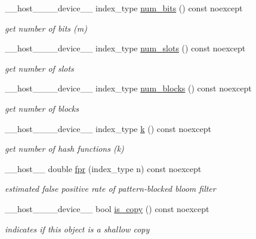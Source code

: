 \begin{DoxyCompactItemize}
\+\_\+\+\_\+host\+\_\+\+\_\+\+\_\+\+\_\+device\+\_\+\+\_\+ index\+\_\+type \hyperlink{classwarpcore_1_1BloomFilter_a54a25926cf770e834c47ad5164e91443}{num\+\_\+bits} () const noexcept
\begin{DoxyCompactList}\small\item\em get number of bits (m) \end{DoxyCompactList}\item 
\+\_\+\+\_\+host\+\_\+\+\_\+\+\_\+\+\_\+device\+\_\+\+\_\+ index\+\_\+type \hyperlink{classwarpcore_1_1BloomFilter_a1ab7ecd7bcc3f6321a252f94d63965eb}{num\+\_\+slots} () const noexcept
\begin{DoxyCompactList}\small\item\em get number of slots \end{DoxyCompactList}\item 
\+\_\+\+\_\+host\+\_\+\+\_\+\+\_\+\+\_\+device\+\_\+\+\_\+ index\+\_\+type \hyperlink{classwarpcore_1_1BloomFilter_a10fcbb540441eff40a1d0fccd1b992bd}{num\+\_\+blocks} () const noexcept
\begin{DoxyCompactList}\small\item\em get number of blocks \end{DoxyCompactList}\item 
\+\_\+\+\_\+host\+\_\+\+\_\+\+\_\+\+\_\+device\+\_\+\+\_\+ index\+\_\+type \hyperlink{classwarpcore_1_1BloomFilter_a33c972e8a462625d6253b58bbd5585f3}{k} () const noexcept
\begin{DoxyCompactList}\small\item\em get number of hash functions (k) \end{DoxyCompactList}\item 
\+\_\+\+\_\+host\+\_\+\+\_\+ double \hyperlink{classwarpcore_1_1BloomFilter_af77c52ec3c2223cfe335a65197bed625}{fpr} (index\+\_\+type n) const noexcept
\begin{DoxyCompactList}\small\item\em estimated false positive rate of pattern-\/blocked bloom filter \end{DoxyCompactList}\item 
\+\_\+\+\_\+host\+\_\+\+\_\+\+\_\+\+\_\+device\+\_\+\+\_\+ bool \hyperlink{classwarpcore_1_1BloomFilter_a55aaae73d8a1a8d811779fcf372f6c8c}{is\+\_\+copy} () const noexcept
\begin{DoxyCompactList}\small\item\em indicates if this object is a shallow copy \end{DoxyCompactList}\end{DoxyCompactItemize}
